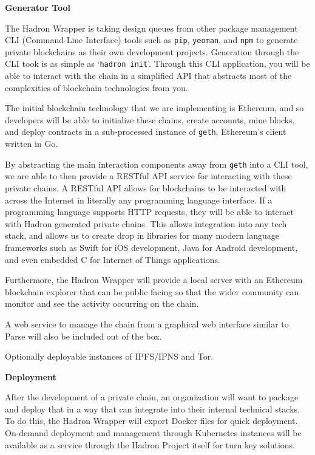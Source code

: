 \documentclass{%
	article}
\begin{document}
\begin{center}
\textbf{Generator Tool}
\end{center}

The Hadron Wrapper is taking design queues from other package management CLI (Command-Line Interface) tools such as \texttt{pip}, \texttt{yeoman}, and \texttt{npm} to generate private blockchains as their own development projects. Generation through the CLI took is as simple as ‘\texttt{hadron init}’. Through this CLI application, you will be able to interact with the chain in a simplified API that abstracts most of the complexities of blockchain technologies from you.

The initial blockchain technology that we are implementing is Ethereum, and so developers will be able to initialize these chains, create accounts, mine blocks, and deploy contracts in a sub-processed instance of \texttt{geth}, Ethereum’s client written in Go.

By abstracting the main interaction components away from \texttt{geth} into a CLI tool, we are able to then provide a RESTful API service for interacting with these private chains. A RESTful API allows for blockchains to be interacted with across the Internet in literally any programming language interface. If a programming language supports HTTP requests, they will be able to interact with Hadron generated private chains. This allows integration into any tech stack, and allows us to create drop in libraries for many modern language frameworks such as Swift for iOS development, Java for Android development, and even embedded C for Internet of Things applications.

Furthermore, the Hadron Wrapper will provide a local server with an Ethereum blockchain explorer that can be public facing so that the wider community can monitor and see the activity occurring on the chain.

A web service to manage the chain from a graphical web interface similar to Parse will also be included out of the box.

Optionally deployable instances of IPFS/IPNS and Tor.

\begin{center}
\textbf{Deployment}
\end{center}

After the development of a private chain, an organization will want to package and deploy that in a way that can integrate into their internal technical stacks. To do this, the Hadron Wrapper will export Docker files for quick deployment. On-demand deployment and management through Kubernetes instances will be available as a service through the Hadron Project itself for turn key solutions.
\end{document}
